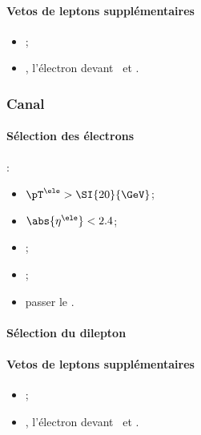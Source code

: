 \paragraph{Vetos de leptons supplémentaires}
\LeptonVetoes
\begin{itemize}
    \item \LeptonVetoesExtraMuonMuMu;
    \item \LeptonVetoesExtraEle, l'électron devant \PassConversionVeto\ et \LessTwoMissingHitsVertex.
\end{itemize}
\subsubsection{Canal \ele\ele}
\paragraph{Sélection des électrons}
:
\begin{itemize}
    \item $\pT^{\ele} > \SI{20}{\GeV}$;
    \item $\abs{\eta^{\ele}} < 2.4$;
    \item \Leptondzdxy;
    \item {};
    \item passer le \NinetyNineEleMVA.
\end{itemize}
\paragraph{Sélection du dilepton}
\AtLeastOneOSPair{\ele\ele}
\IfMoreOnePair
\paragraph{Vetos de leptons supplémentaires}
\LeptonVetoes
\begin{itemize}
    \item \LeptonVetoesExtraMuon;
    \item \LeptonVetoesExtraEleEleEle, l'électron devant \PassConversionVeto\ et \LessTwoMissingHitsVertex.
\end{itemize}
